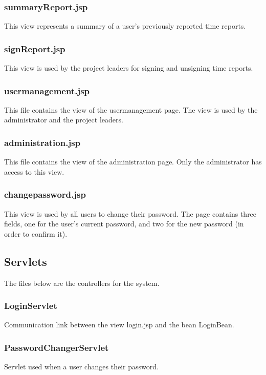 \documentclass{article}
\begin{document}
\subsubsection{summaryReport.jsp}
This view represents a summary of a user's previously reported time reports.

\subsubsection{signReport.jsp}
This view is used by the project leaders for signing and unsigning time reports.

\subsubsection{usermanagement.jsp}
This file contains the view of the usermanagement page. The view is used by the administrator and the project leaders.

\subsubsection{administration.jsp}
This file contains the view of the administration page. Only the administrator has access to this view.

\subsubsection{changepassword.jsp}
This view is used by all users to change their password. The page contains three fields, one for the user's current password, and two for the new password (in order to confirm it).

\subsection{Servlets}
The files below are the controllers for the system.

\subsubsection{LoginServlet}
Communication link between the view login.jsp and the bean LoginBean.

\subsubsection{PasswordChangerServlet}
Servlet used when a user changes their password.
\end{document}

